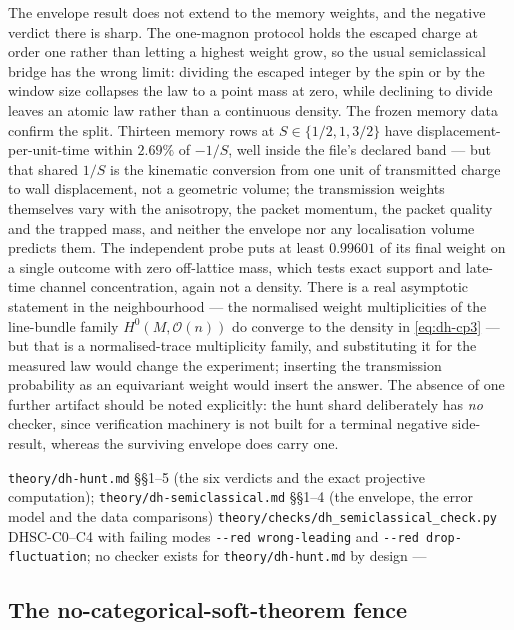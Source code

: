 \begin{scope}
\label{scope:dh-weights}
The envelope result does not extend to the memory weights, and the negative
verdict there is sharp. The one-magnon protocol holds the escaped charge at
order one rather than letting a highest weight grow, so the usual
semiclassical bridge has the wrong limit: dividing the escaped integer by the
spin or by the window size collapses the law to a point mass at zero, while
declining to divide leaves an atomic law rather than a continuous density. The
frozen memory data confirm the split. Thirteen memory rows at
$S \in \{1/2,1,3/2\}$ have displacement-per-unit-time within $2.69\%$ of
$-1/S$, well inside the file's declared band — but that shared $1/S$ is the
kinematic conversion from one unit of transmitted charge to wall displacement,
not a geometric volume; the transmission weights themselves vary with the
anisotropy, the packet momentum, the packet quality and the trapped mass, and
neither the envelope nor any localisation volume predicts them. The
independent probe puts at least $0.99601$ of its final weight on a single
outcome with zero off-lattice mass, which tests exact support and late-time
channel concentration, again not a density. There is a real asymptotic
statement in the neighbourhood — the normalised weight multiplicities of the
line-bundle family $H^0(M,\mathcal{O}(n))$ do converge to the density in
\eqref{eq:dh-cp3} — but that is a normalised-trace multiplicity family, and
substituting it for the measured law would change the experiment; inserting
the transmission probability as an equivariant weight would insert the answer.
The absence of one further artifact should be noted explicitly: the hunt shard
deliberately has \emph{no} checker, since verification machinery is not built
for a terminal negative side-result, whereas the surviving envelope does carry
one.
\end{scope}

%
{\texttt{theory/dh-hunt.md} §§1--5 (the six verdicts and the exact projective computation); \texttt{theory/dh-semiclassical.md} §§1--4 (the envelope, the error model and the data comparisons)}%
{\texttt{theory/checks/dh\_semiclassical\_check.py} DHSC-C0--C4 with failing modes \texttt{-{}-red wrong-leading} and \texttt{-{}-red drop-fluctuation}; no checker exists for \texttt{theory/dh-hunt.md} by design}%
{---}

\subsection{The no-categorical-soft-theorem fence}
\label{sub:no-cat-soft}

